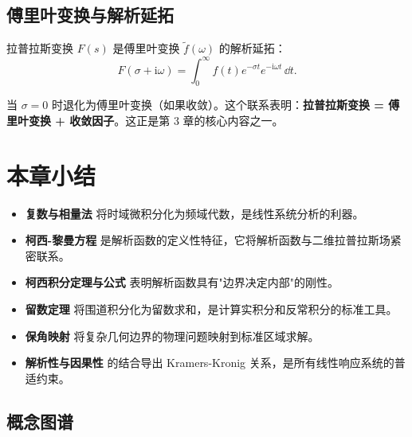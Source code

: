 \subsection{傅里叶变换与解析延拓}

拉普拉斯变换 $F(s)$ 是傅里叶变换 $\tilde{f}(\omega)$ 的解析延拓：
\begin{equation}
F(\sigma + \mathrm{i}\omega) = \int_0^{\infty} f(t) e^{-\sigma t} e^{-\mathrm{i}\omega t}\,\dd t.
\end{equation}

当 $\sigma=0$ 时退化为傅里叶变换（如果收敛）。这个联系表明：\textbf{拉普拉斯变换 = 傅里叶变换 + 收敛因子}。这正是第 3 章的核心内容之一。

\section{本章小结}

\begin{itemize}
\item \textbf{复数与相量法} 将时域微积分化为频域代数，是线性系统分析的利器。
\item \textbf{柯西-黎曼方程} 是解析函数的定义性特征，它将解析函数与二维拉普拉斯场紧密联系。
\item \textbf{柯西积分定理与公式} 表明解析函数具有"边界决定内部"的刚性。
\item \textbf{留数定理} 将围道积分化为留数求和，是计算实积分和反常积分的标准工具。
\item \textbf{保角映射} 将复杂几何边界的物理问题映射到标准区域求解。
\item \textbf{解析性与因果性} 的结合导出 Kramers-Kronig 关系，是所有线性响应系统的普适约束。
\end{itemize}

\subsection*{概念图谱}

\begin{center}
\end{center}

